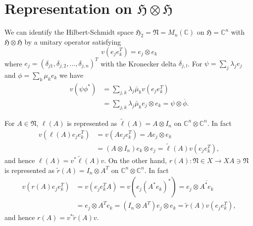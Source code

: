 \section{Representation on $\mathfrak{H}\otimes\mathfrak{H}$}

 We can identify the Hilbert-Schmidt space $\mathfrak{H}_2=\mathfrak{N}=M_n(\mathbb{C})$ on $\mathfrak{H}=\mathbb{C}^n$ with $\mathfrak{H}\otimes\mathfrak{H}$
by a unitary operator satisfying 
$$
v(e_je_k^T)=e_j\otimes e_k
$$
where $e_j=(\delta_{j1},\delta_{j,2},...,\delta_{j,n})^T$ with the Kronecker delta $\delta_{j,l}$. 
For $\psi=\sum_j \lambda_j e_j$ and $\phi=\sum_k \mu_k e_k$
we have
$$
\begin{split}
v(\psi\phi^\ast)&=\sum_{j,k}\lambda_j\bar{\mu}_k v(e_je_k^T)\\
&=\sum_{j,k}\lambda_j\bar{\mu}_k e_j\otimes e_k={\psi}\otimes \overline{\phi}.
\end{split}
$$

For $A\in \mathfrak{N}$, $\ell(A)$ is represented as $\tilde{\ell}(A)=A\otimes I_n$ on $\mathbb{C}^n\otimes \mathbb{C}^n$.
In fact
 $$
 \begin{split}
 v(\ell(A)e_je_k^T)&=v(Ae_je_k^T)=Ae_j\otimes e_k\\
 &= (A\otimes I_n)e_k\otimes  e_j=\tilde{\ell}(A)v(e_je_k^T),
 \end{split} 
 $$
 and hence $\ell(A)=v^{\ast}\tilde{\ell}(A)v$. 
On the other hand, $r(A):\mathfrak{N}\in X \to XA\ni\mathfrak{N}$ is 
represented as $\tilde{r}(A)=I_n\otimes A^T$ on $\mathbb{C}^n\otimes \mathbb{C}^n$.
In fact
 $$
 \begin{split}
 v(r(A)e_je_k^T)&=v(e_je_k^TA)=v(e_j(A^\ast e_k)^\ast)=e_j\otimes \overline{A^\ast e_k}\\
 &= e_j \otimes A^T e_k= (I_n\otimes A^T)e_j\otimes  e_k=\tilde{r}(A)v(e_je_k^T),
 \end{split} 
 $$
 and hence $r(A)=v^{\ast}\tilde{r}(A) v$. 
